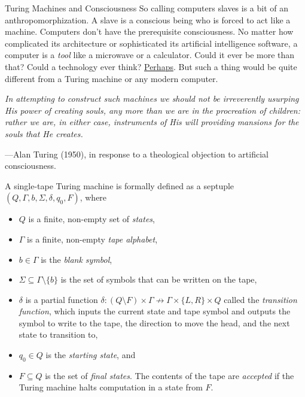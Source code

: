 \begin{bluebox}{Turing Machines and Consciousness}
    So calling computers slaves is a bit of an anthropomorphization. A slave is a conscious being who is forced to act like a machine. Computers don't have the prerequisite consciousness. No matter how complicated its architecture or sophisticated its artificial intelligence software, a computer is a \textit{tool} like a microwave or a calculator. Could it ever be more than that? Could a technology ever think? \underline{Perhaps}. But such a thing would be quite different from a Turing machine or any modern computer.

        
    \parbreak
        
    \begin{displayquote}
        \textit{In attempting to construct such machines we should not be irreverently usurping His power of creating souls, any more than we are in the procreation of children: rather we are, in either case, instruments of His will providing mansions for the souls that He creates.}
        \vspace{4mm}
        \begin{flushright}
            ---Alan Turing (1950),
            in response to a theological objection to artificial consciousness.
        \end{flushright}
    \end{displayquote}

\end{bluebox}

A single-tape Turing machine is formally defined as a septuple $(Q,\Gamma,b,\Sigma,\delta,q_0,F)$, where

\begin{itemize}
    \item $Q$ is a finite, non-empty set of \textit{states},
    \item $\Gamma$ is a finite, non-empty \textit{tape alphabet},
    \item $b\in\Gamma$ is the \textit{blank symbol},
    \item $\Sigma\subseteq\Gamma\setminus \{b\}$ is the set of symbols that can be written on the tape,
    \item $\delta$ is a partial function $\delta : (Q\setminus F)\times\Gamma\nrightarrow \Gamma\times\{L,R\}\times Q$ called the \textit{transition function}, which inputs the current state and tape symbol and outputs the symbol to write to the tape, the direction to move the head, and the next state to transition to,
    \item $q_0\in Q$ is the \textit{starting state}, and
    \item $F\subseteq Q$ is the set of \textit{final states}. The contents of the tape are \textit{accepted} if the Turing machine halts computation in a state from $F$.
\end{itemize}

